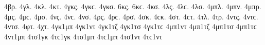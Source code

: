 {%
4βρ.   %
4γλ.   %
4κλ.   %
4κτ.   %
4γκς. 4γκϲ.   %
4γκσ. 
6κς. 6κϲ.   %
4κσ. 
4λς. 4λϲ.   %
4λσ. 
4μπλ.   %
4μπν.   %
4μπρ.   %
4μς. 4μϲ.   %
4μσ. 
4νς. 4νϲ.   %
4νσ. 
4ρς. 4ρϲ.   %
4ρσ. 
4σκ. 4ϲκ.   %
4στ. 4ϲτ.   %
4τλ.   %
4τρ.   %
4ντς. 4ντϲ.   %
4ντσ. 
4φτ.   %
4χτ.   %
4γκ1μπ 
4γκ1ντ 
4γκ1τζ 
4γκ1τσ 4γκ1τϲ 
4μπ1ντ 
4μπ1τζ 
4μπ1τσ 4μπ1τϲ 
4ντ1μπ 
4τσ1γκ 4τϲ1γκ 
4τσ1μπ 4τϲ1μπ 
4τσ1ντ 4τϲ1ντ 
}
\endgroup
\endinput
